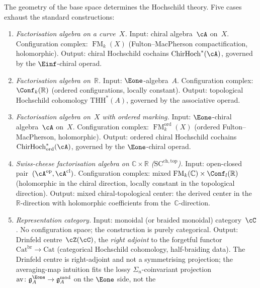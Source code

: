 \begin{principle}
\label{princ:geometric-origin-hochschild}
The geometry of the base space determines the Hochschild theory.
Five cases exhaust the standard constructions:
\begin{enumerate}[label=\textup{(\roman*)}]
\item \emph{Factorisation algebra on a curve~$X$.}
 Input: chiral algebra~$\cA$ on~$X$.
 Configuration complex: $\operatorname{FM}_k(X)$
 (Fulton--MacPherson compactification, holomorphic).
 Output: chiral Hochschild cochains
 $\operatorname{ChirHoch}^*(\cA)$, governed by the
 $\Einf$-chiral operad.
\item \emph{Factorisation algebra on~$\mathbb{R}$.}
 Input: $\Eone$-algebra~$A$.
 Configuration complex:
 $\Conf_k(\mathbb{R})$ (ordered configurations, locally
 constant).
 Output: topological Hochschild cohomology
 $\mathrm{THH}^*(A)$, governed by the associative operad.
\item \emph{Factorisation algebra on~$X$ with ordered marking.}
 Input: $\Eone$-chiral algebra~$\cA$ on~$X$.
 Configuration complex:
 $\operatorname{FM}_k^{\mathrm{ord}}(X)$ (ordered
 Fulton--MacPherson, holomorphic).
 Output: ordered chiral Hochschild cochains
 $\operatorname{ChirHoch}^*_{\mathrm{ord}}(\cA)$, governed by
 the $\Eone$-chiral operad.
\item \emph{Swiss-cheese factorisation algebra on
 $\mathbb{C} \times \mathbb{R}$
 \textup{(}$\mathrm{SC}^{\mathrm{ch,top}}$\textup{)}.}
 Input: open-closed pair~$(\cA^{\mathrm{op}}, \cA^{\mathrm{cl}})$.
 Configuration complex: mixed
 $\operatorname{FM}_k(\mathbb{C}) \times \Conf_l(\mathbb{R})$
 (holomorphic in the chiral direction, locally constant in the
 topological direction).
 Output: mixed chiral-topological center: the derived center in
 the~$\mathbb{R}$-direction with holomorphic coefficients from
 the~$\mathbb{C}$-direction.
\item \emph{Representation category.}
 Input: monoidal (or braided monoidal) category~$\cC$.
 No configuration space; the construction is purely categorical.
 Output: Drinfeld centre~$\cZ(\cC)$, the \emph{right
 adjoint} to the forgetful functor
 $\mathrm{Cat}^{\mathrm{br}} \to \mathrm{Cat}$ (categorical
 Hochschild cohomology, half-braiding data). The Drinfeld
 centre is right-adjoint and not a symmetrising projection; the
 averaging-map intuition fits the lossy
 $\Sigma_n$-coinvariant projection
 $\mathrm{av}\colon \mathfrak{g}^{\Eone}_A \to
 \mathfrak{g}^{\mathrm{mod}}_A$ on the $\Eone$ side, not the

\end{enumerate}
\end{principle}
